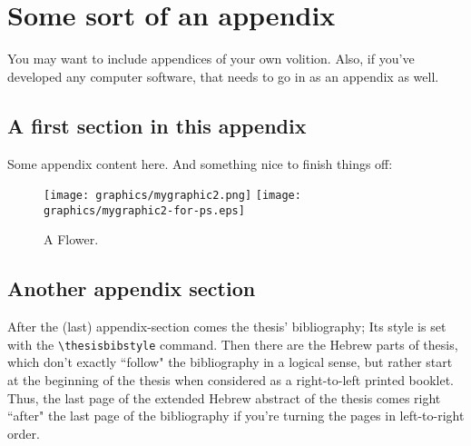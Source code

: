 \chapter{Some sort of an appendix}
\label{appendix:somesort}

You may want to include appendices of your own volition. Also, if you've developed any computer software, that needs to go in as an appendix as well.

\section{A first section in this appendix}

Some appendix content here. And something nice to finish things off:

\begin{figure}[htb]
  \centering
  \ifpdf
    \texttt{[image: graphics/mygraphic2.png]}
  \else
    \texttt{[image: graphics/mygraphic2-for-ps.eps]}
  \fi
  \caption{A Flower.}
\end{figure}

\section{Another appendix section}
After the (last) appendix-section comes the thesis' bibliography; Its style is set with the \verb|\thesisbibstyle| command. Then there are the Hebrew parts of thesis, which don't exactly ``follow" the bibliography in a logical sense, but rather start at the beginning of the thesis when considered as a right-to-left printed booklet. Thus, the last page of the extended Hebrew abstract of the thesis comes right ``after" the last page of the bibliography if you're turning the pages in left-to-right order.
